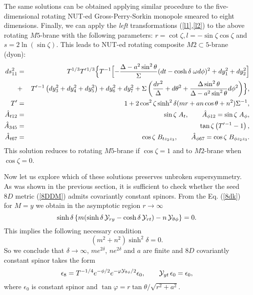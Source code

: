 \documentclass[a4paper,12pt]{article}
\begin{document}
The same solutions can be obtained applying similar procedure to
the five-dimensional rotating NUT-ed Gross-Perry-Sorkin monopole
\cite{ChGaMaSh99} smeared to eight dimensions. Finally, we can
apply the {\em left} transformations (\ref{l1},\ref{l2}) to the
above rotating $M5$-brane with the following parameters:
$r=\cot\zeta, l=-\sin\zeta\cos\zeta$ and $s=2 \ln(\sin\zeta)$.
This leads to NUT-ed rotating composite $M2\subset 5$-brane
(dyon):
\begin{eqnarray}
ds_{11}^2 &=& T^{1/3} T'{}^{1/3} \Bigl\{ T^{-1} \Bigl[ -
\frac{\Delta-a^2\sin^2\theta}{\Sigma} (dt-\cosh\delta\;\omega
d\phi)^2 + dy_1^2 + dy_2^2 \Bigr] \nonumber\\
&+& T'{}^{-1} \left( dy_3^2+dy_4^2+dy_5^2 \right)+dy_6^2+dy_7^2 +
\Sigma \left( \frac{d r^2}{\Delta} + d\theta^2 +
\frac{\Delta\sin^2\theta}{\Delta-a^2\sin^2\theta}d\phi^2
\right)\Bigr\}, \nonumber \\
T' &=& 1 + 2 \cos^2\zeta \sinh^2\delta (mr+an\cos\theta+n^2)
\Sigma^{-1}, \nonumber \\
\hat A_{t12} &=& \sin\zeta \; A_t, \qquad
\hat A_{\phi12} = \sin\zeta \; A_\phi, \nonumber \\
\hat A_{345} &=& \tan\zeta \left( T'{}^{-1} - 1 \right),
\nonumber \\
\hat A_{t67} &=& \cos\zeta \; B_{tz_2z_3}, \qquad \hat A_{\phi67}
= \cos\zeta \; B_{\phi z_2z_3}.\label{25DDM}
\end{eqnarray}
This solution reduces to rotating $M5$-brane if $\cos\zeta=1$ and
to $M2$-brane when $\cos\zeta=0$.

Now let us explore which of these solutions preserves unbroken
supersymmetry. As was shown in the previous section, it is
sufficient to check whether the seed $8D$ metric (\ref{8DDM})
admits covariantly constant spinors. From the Eq. (\ref{8dk}) for
$M=y$ we obtain in the asymptotic region $r\to\infty$
\begin{equation}
\sinh\delta \left\{ m(\sinh\delta\, {\cal Y}_{ry} - \cosh\delta\,
{\cal Y}_{rt}) - n\, {\cal Y}_{\theta\phi}\right\} = 0.
\end{equation}
This implies the following necessary condition
\begin{equation}
(m^2+n^2) \sinh^2\delta = 0.
\end{equation}
So we conclude that $\delta\to \infty$, $m e^{2\delta}$, $n
e^{2\delta}$ and $a$ are finite and $8D$ covariantly constant
spinor takes the form
\begin{equation}
\epsilon_8 = T^{-1/4} e^{-\phi/2} e^{-\varphi {\cal
Y}_{\theta\phi}/2} \epsilon_0, \qquad {\cal Y}_{yt} \, \epsilon_0
= \epsilon_0,
\end{equation}
where $\epsilon_0$ is constant spinor and $\tan\varphi =
r\tan\theta/\sqrt{r^2+a^2}$.
\end{document}
